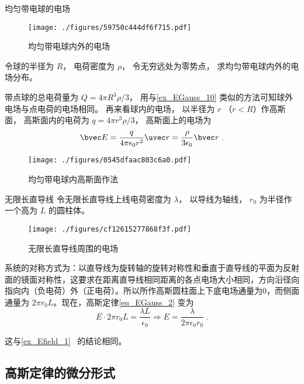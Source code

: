 \begin{example}{均匀带电球的电场}\label{ex_EGauss_30}
\begin{figure}[ht]
\centering
\texttt{[image: ./figures/59750c444df6f715.pdf]}
\caption{均匀带电球内外的电场} \label{fig_EGauss_8}
\end{figure}
令球的半径为 $R$， 电荷密度为 $\rho$， 令无穷远处为零势点， 求均匀带电球内外的电场分布。 

带点球的总电荷量为 $Q = 4\pi R^3\rho/3$， 用与\autoref{ex_EGauss_10} 类似的方法可知球外电场与点电荷的电场相同。 再来看球内的电场， 以半径为 $r$ （$r < R$）作高斯面， 高斯面内的电荷为 $q = 4\pi r^3\rho/3$， 高斯面上的电场为
\begin{equation}
\bvec E = \frac{q}{4\pi\epsilon_0 r^2} \uvec r = \frac{\rho}{3\epsilon_0}\bvec r~.
\end{equation}
\begin{figure}[ht]
\centering
\texttt{[image: ./figures/0545dfaac803c6a0.pdf]}
\caption{均匀带电球内高斯面作法} \label{fig_EGauss_9}
\end{figure}
\end{example}

\begin{example}{无限长直导线}\label{ex_EGauss_1}
令无限长直导线上线电荷密度为 $\lambda$， 以导线为轴线， $r_0$ 为半径作一个高为 $L$ 的圆柱体。 
\begin{figure}[ht]
\centering
\texttt{[image: ./figures/cf12615277868f3f.pdf]}
\caption{无限长直导线周围的电场} \label{fig_EGauss_10}
\end{figure}
系统的对称方式为：以直导线为旋转轴的旋转对称性和垂直于直导线的平面为反射面的镜面对称性，这要求在距离直导线相同距离的各点电场大小相同，方向沿径向指向内（负电荷）外（正电荷）。所以所作高斯圆柱面上下底电场通量为0，而侧面通量为 $2\pi r_0L$。现在，高斯定律\autoref{eq_EGauss_2} 变为
\begin{equation}
E\cdot2\pi r_0L=\frac{\lambda L}{\epsilon_0}\Rightarrow E=\frac{\lambda}{2\pi \epsilon_0r_0 }~.
\end{equation}

这与\autoref{ex_Efield_1}~ 的结论相同。
\end{example}

\subsection{高斯定律的微分形式}

